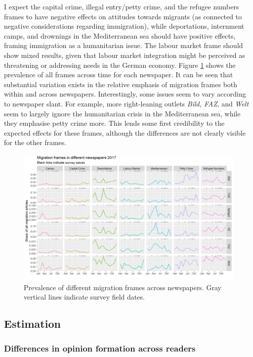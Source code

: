 \documentclass{article}
\begin{document}
I expect the capital crime, illegal entry/petty crime, and the refugee numbers frames to have negative effects on attitudes towards migrants (as connected to negative considerations regarding immigration), while deportations, internment camps, and drownings in the Mediterranean sea should have positive effects, framing immigration as a humanitarian issue. The labour market frame should show mixed results, given that labour market integration might be perceived as threatening or addressing needs in the German economy. Figure \ref{fig:frames} shows the prevalence of all frames across time for each newspaper. It can be seen that substantial variation exists in the relative emphasis of migration frames both within and across newspapers. Interestingly, some issues seem to vary according to newspaper slant. For example, more right-leaning outlets \textit{Bild, FAZ}, and \textit{Welt} seem to largely ignore the humanitarian crisis in the Mediterranean sea, while they emphasise petty crime more. This lends some first credibility to the expected effects for these frames, although the differences are not clearly visible for the other frames.

\begin{figure}[!ht]
    \centering
    \includegraphics[width=\textwidth]{paper/vis/frames_papers_focus.png}
    \caption{Prevalence of different migration frames across newspapers. Gray vertical lines indicate survey field dates.}
    \label{fig:frames}
\end{figure}


\subsection{Estimation}

\subsubsection{Differences in opinion formation across readers}\label{sec:did_readers}
\end{document}
